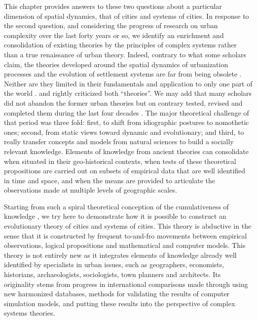 \documentclass[10pt,letterpaper]{article}
\begin{document}
This chapter provides answers to these two questions about a particular dimension of spatial dynamics, that of cities and systems of cities. In response to the second question, and considering the progress of research on urban complexity over the last forty years or so, we identify an enrichment and consolidation of existing theories by the principles of complex systems rather than a true renaissance of urban theory. Indeed, contrary to what some scholars claim, the theories developed around the spatial dynamics of urbanization processes and the evolution of settlement systems are far from being obsolete \citep{brenner2014urban}. Neither are they limited in their fundamentals and application to only one part of the world \citep{robinson2016comparative}. \cite{scott2015nature} and \cite{wu2020emerging} rightly criticized both ``theories''. We may add that many scholars did not abandon the former urban theories but on contrary tested, revised and completed them during the last four decades \citep{pumain1997pour,pumain1998urban,pumain2003approche,pumain2020theories,batty2013new}. The major theoretical challenge of that period was three fold: first, to shift from idiographic postures to nomothetic ones; second, from static views toward dynamic and evolutionary; and third, to really transfer concepts and models from natural sciences to build a socially relevant knowledge. Elements of knowledge from ancient theories can consolidate when situated in their geo-historical contexts, when tests of these theoretical propositions are carried out on subsets of empirical data that are well identified in time and space, and when the means are provided to articulate the observations made at multiple levels of geographic scales.

Starting from such a spiral theoretical conception of the cumulativeness of knowledge \citep{pumain2005cumulativite}, we try here to demonstrate how it is possible to construct an evolutionary theory of cities and systems of cities. This theory is abductive in the sense that it is constructed by frequent to-and-fro movements between empirical observations, logical propositions and mathematical and computer models. This theory is not entirely new as it integrates elements of knowledge already well identified by specialists in urban issues, such as geographers, economists, historians, archaeologists, sociologists, town planners and architects. Its originality stems from progress in international comparisons made through using new harmonized databases, methods for validating the results of computer simulation models, and putting these results into the perspective of complex systems theories.
\end{document}
